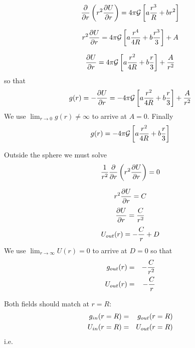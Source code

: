 \begin{equation}
\frac{\partial}{\partial r} \left( r^2 \frac{\partial U}{\partial r} \right) = 4 \pi {\cal G} 
 \left[ a \frac{r^3}{R} + b r^2 \right] \nonumber
\end{equation}

\begin{equation}
r^2 \frac{\partial U}{\partial r} = 4 \pi {\cal G} \left[a \frac{r^4}{4R} + b \frac{r^3}{3} \right] + A  \nonumber
\end{equation}

\begin{equation}
\frac{\partial U}{\partial r} = 4 \pi {\cal G} \left[ a\frac{r^2}{4R} + b \frac{r}{3} \right] + \frac{A}{r^2} \nonumber
\end{equation}
so that 
\begin{equation}
g(r)=-\frac{\partial U}{\partial r} = -4 \pi {\cal G} \left[ a \frac{r^2}{4R} + b \frac{r}{3} \right] + \frac{A}{r^2} \nonumber
\end{equation}
We use $\lim_{r\rightarrow 0} g(r) \neq \infty$ to arrive at $A=0$.
Finally 
\begin{equation}
g(r)= -4 \pi {\cal G} \left[ a \frac{r^2}{4R} + b \frac{r}{3} \right]  \nonumber
\end{equation}

Outside the sphere we must solve 
\begin{equation}
\frac{1}{r^2} \frac{\partial}{\partial r} \left( r^2 \frac{\partial U}{\partial r} \right) = 0 \nonumber
\end{equation}

\begin{equation}
r^2 \frac{\partial U}{\partial r}  = C \nonumber 
\end{equation}
\begin{equation}
\frac{\partial U}{\partial r}  = \frac{C}{r^2} \nonumber
\end{equation}
\begin{equation}
U_{out}(r) = -\frac{C}{r} + D  \nonumber
\end{equation}
We use $\lim_{r\rightarrow\infty}U(r)=0$ to arrive at $D=0$ so that 
\begin{eqnarray}
g_{out}(r) &=& -\frac{C}{r^2}  \nonumber\\
U_{out}(r) &=& -\frac{C}{r} \nonumber
\end{eqnarray}

Both fields should match at $r=R$:
\begin{eqnarray}
g_{in}(r=R) &=& g_{out}(r=R) \nonumber\\
U_{in}(r=R) &=& U_{out}(r=R) \nonumber
\end{eqnarray}
i.e.


